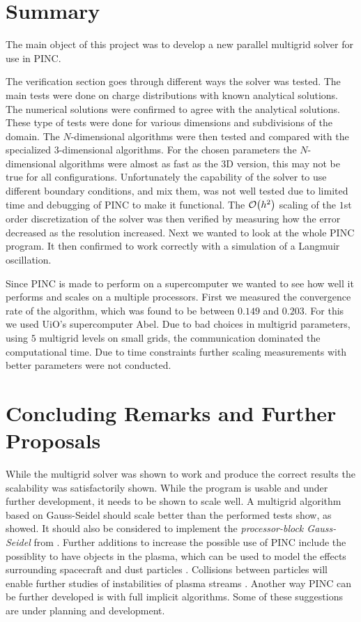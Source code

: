 
\section{Summary}
	The main object of this project was to develop a new parallel multigrid solver
	for use in PINC.

	The verification section goes through different ways the
	solver was tested. The main tests were done on charge distributions
	with known analytical solutions. The numerical solutions were confirmed to
 	agree with the analytical solutions. These type of tests were done for various
	dimensions and subdivisions of the domain. The \(N\)-dimensional algorithms were
	then tested and compared with the specialized \(3\)-dimensional algorithms. For the chosen
	parameters the \(N\)-dimensional algorithms were almost as fast as the \(3\)D version, this may not be true
	for all configurations. Unfortunately the capability of the solver to use different boundary conditions, and mix them,
 	was not well tested due to limited time and debugging of PINC to make it functional.
	The \(\order{h^2}\) scaling of the \(1\)st order discretization of the solver
 	was then verified by measuring how the error decreased as the resolution increased.
	Next we wanted to look at the whole PINC program. It then confirmed to work correctly
	with a simulation of a Langmuir oscillation.

	Since PINC is made to perform on a supercomputer we wanted to see how well it
	performs and scales on a multiple processors. First we measured the convergence rate of the algorithm,
	which was found to be between \(0.149\) and \(0.203\). For this we used UiO's supercomputer Abel.
	Due to bad choices in multigrid parameters, using \(5\) multigrid levels on small grids, the communication
	dominated the computational time. Due to time constraints further scaling measurements with better
	parameters were not conducted.

\section{Concluding Remarks and Further Proposals}
	While the multigrid solver was shown to work and produce the correct results the scalability
	was satisfactorily shown. While the program is usable and under further development, it needs to be shown
	to scale well. A multigrid algorithm based on Gauss-Seidel should scale better than the performed tests show,
	as \citet{jung_parallelization_1997} showed. It should also be considered to implement the \textit{processor-block Gauss-Seidel}
	from \citet{adams_parallel_2003}. Further additions to increase the possible use of PINC include
	the possiblity to have objects in the plasma, which can be used to model the effects surrounding spacecraft
	and dust particles \citep{miloch_wake_2010,miyake_plasma_2013,ergun_spacecraft_2010}. Collisions
	between particles will enable further studies of instabilities of plasma streams \citep{brackbill_particle_1995}.
	Another way PINC can be further developed is with full implicit algorithms. Some of these suggestions are under planning and development.
